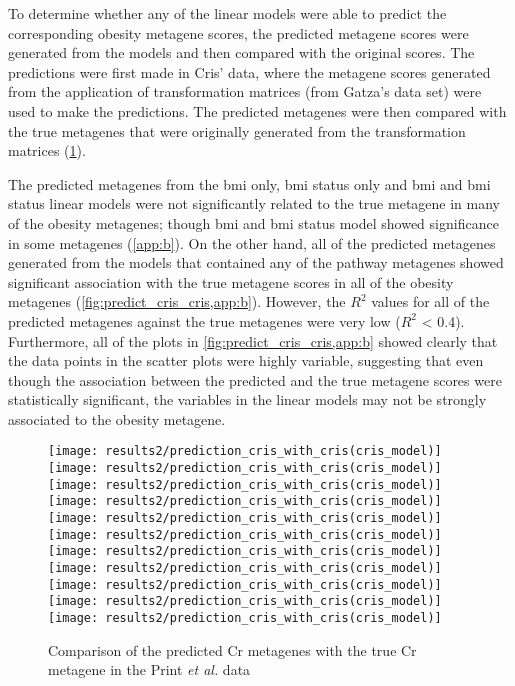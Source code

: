 To determine whether any of the linear models were able to predict the corresponding obesity metagene scores, the predicted metagene scores were generated from the models and then compared with the original scores.
The predictions were first made in Cris' data, where the metagene scores generated from the application of transformation matrices (from Gatza's data set) were used to make the predictions.
The predicted metagenes were then compared with the true metagenes that were originally generated from the transformation matrices (\cref{fig:predict_cris_cris}).

The predicted metagenes from the \gls{bmi} only, \gls{bmi} status only and \gls{bmi} and \gls{bmi} status linear models were not significantly related to the true metagene in many of the obesity metagenes; though \gls{bmi} and \gls{bmi} status model showed significance in some metagenes (\cref{app:b}).
On the other hand, all of the predicted metagenes generated from the models that contained any of the pathway metagenes showed significant association with the true metagene scores in all of the obesity metagenes (\cref{fig:predict_cris_cris,app:b}).
However, the $R^2$ values for all of the predicted metagenes against the true metagenes were very low ($R^2$ \textless{} 0.4).
Furthermore, all of the plots in \cref{fig:predict_cris_cris,app:b} showed clearly that the data points in the scatter plots were highly variable, suggesting that even though the association between the predicted and the true metagene scores were statistically significant, the variables in the linear models may not be strongly associated to the obesity metagene.

\begin{figure}[htpb]
	\centering
	\texttt{[image: results2/prediction\_cris\_with\_cris(cris\_model)]}
	\texttt{[image: results2/prediction\_cris\_with\_cris(cris\_model)]}
	\texttt{[image: results2/prediction\_cris\_with\_cris(cris\_model)]}
	\texttt{[image: results2/prediction\_cris\_with\_cris(cris\_model)]}
	\texttt{[image: results2/prediction\_cris\_with\_cris(cris\_model)]}
	\texttt{[image: results2/prediction\_cris\_with\_cris(cris\_model)]}
	\texttt{[image: results2/prediction\_cris\_with\_cris(cris\_model)]}
	\texttt{[image: results2/prediction\_cris\_with\_cris(cris\_model)]}
	\texttt{[image: results2/prediction\_cris\_with\_cris(cris\_model)]}
	\texttt{[image: results2/prediction\_cris\_with\_cris(cris\_model)]}
	\texttt{[image: results2/prediction\_cris\_with\_cris(cris\_model)]}
	\caption{Comparison of the predicted Cr metagenes with the true Cr metagene in the Print \textit{et al.} data}
	\label{fig:predict_cris_cris}
\end{figure}

